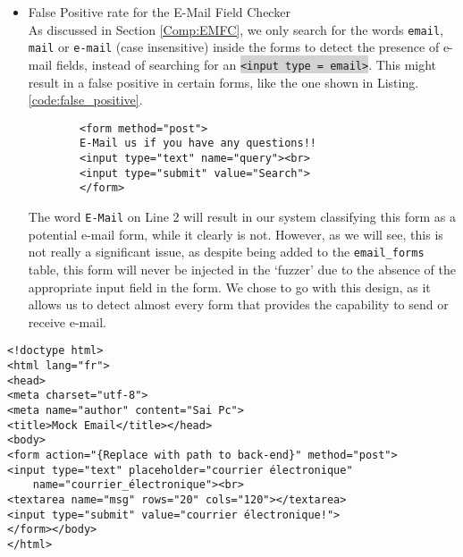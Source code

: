 \begin{itemize}
       	\item \label{issues:fpr}False Positive rate for the E-Mail Field Checker\\
       	As discussed in Section \ref{Comp:EMFC}, we only search for the words \texttt{email}, \texttt{mail} or \texttt{e-mail} (case insensitive) inside the forms to detect the presence of e-mail fields, instead of searching for an \colorbox{lightgray}{\lstinline{<input type = email>}}. This might result in a false positive in certain forms, like the one shown in Listing. \ref{code:false_positive}.
       	
       	\begin{lstlisting}
       	<form method="post">
       	E-Mail us if you have any questions!!
       	<input type="text" name="query"><br>
       	<input type="submit" value="Search">
       	</form>
       	\end{lstlisting}
       	
       	The word \texttt{E-Mail} on Line 2 will result in our system classifying this form as a potential e-mail form, while it clearly is not. However, as we will see, this is not really a significant issue, as despite being added to the \texttt{email\_forms} table, this form will never be injected in the `fuzzer' due to the absence of the appropriate input field in the form. We chose to go with this design, as it allows us to detect almost every form that provides the capability to send or receive e-mail.
	\end{itemize}
	
\begin{lstlisting}
<!doctype html>
<html lang="fr">
<head>
<meta charset="utf-8">
<meta name="author" content="Sai Pc">
<title>Mock Email</title></head>
<body>
<form action="{Replace with path to back-end}" method="post">
<input type="text" placeholder="courrier électronique" 
	name="courrier_électronique"><br>
<textarea name="msg" rows="20" cols="120"></textarea>
<input type="submit" value="courrier électronique!">
</form></body>
</html>
\end{lstlisting}